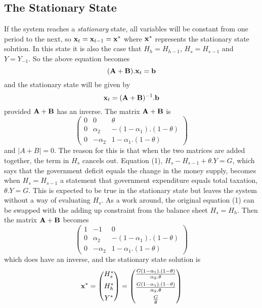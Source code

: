 \documentclass[twoside,a4paper,11pt]{article}
\begin{document}
\subsection{The Stationary State}
If the system reaches a \emph{stationary} state, all variables will be constant from one period to the next, so $\mathbf{x}_t = \mathbf{x}_{t-1} = \mathbf{x}^*$ where $\mathbf{x}^*$ represents the stationary state solution. In this state it is also the case that 
$H_{h} = H_{h-1}$, $H_{s} = H_{s-1}$ and $Y = Y_{-1}$. So the above equation becomes
$$(\mathbf{A} + \mathbf{B}).\mathbf{x}_{t} = \mathbf{b}$$
and the stationary state will be given by
$$\mathbf{x}_{t} = (\mathbf{A} + \mathbf{B})^{-1}.\mathbf{b}$$
provided $\mathbf{A} + \mathbf{B}$ has an inverse.
The matrix $\mathbf{A} + \mathbf{B}$ is
$$\begin{pmatrix}
0 & 0 & \theta\\
0 & \alpha_2 &   - (1-\alpha_1).(1-\theta)\\
0 & -\alpha_2 & 1-\alpha_1.(1-\theta)
\end{pmatrix}$$
and $|A+B| = 0$. The reason for this is that when the two matrices are added together, the term in $H_s$ cancels out. Equation (1), $H_s - H_{s-1} + \theta.Y  = G$, which says that the government deficit equals the change in the money supply, becomes when  $H_s = H_{s-1}$ a statement that government expenditure equals total taxation, $\theta.Y  = G$. This is expected to be true in the stationary state but leaves the system without a way of evaluating $H_s$. As a work around, the original equation (1) can be swapped with the adding up constraint from the balance sheet $H_s = H_h$. Then the matrix $\mathbf{A} + \mathbf{B}$ becomes
$$\begin{pmatrix}
1 & -1 & 0\\
0 & \alpha_2 &   - (1-\alpha_1).(1-\theta)\\
0 & -\alpha_2 & 1-\alpha_1.(1-\theta)
\end{pmatrix}$$
which does have an inverse, and the stationary state solution is
$$\mathbf{x}^*
=
\begin{pmatrix}
H_s^*\\[5pt]
H_h^*\\[5pt]
Y^*
\end{pmatrix}
=
\begin{pmatrix}
\frac{G(1-\alpha_1).(1-\theta)}{\alpha_2.\theta}\\[5pt]
\frac{G(1-\alpha_1).(1-\theta)}{\alpha_2.\theta}\\[5pt]
\frac{G}{\theta}
\end{pmatrix}$$
\end{document}
